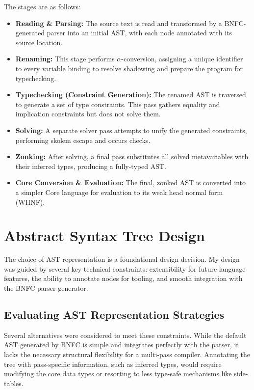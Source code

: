 The stages are as follows:
\begin{itemize}
    \item \textbf{Reading \& Parsing:} The source text is read and transformed by a BNFC-generated parser \cite{bnfc-site-2025} into an initial AST, with each node annotated with its source location.
    \item \textbf{Renaming:} This stage performs $\alpha$-conversion, assigning a unique identifier to every variable binding to resolve shadowing and prepare the program for typechecking.
    \item \textbf{Typechecking (Constraint Generation):} The renamed AST is traversed to generate a set of type constraints. This pass gathers equality and implication constraints but does not solve them.
    \item \textbf{Solving:} A separate solver pass attempts to unify the generated constraints, performing skolem escape and occurs checks.
    \item \textbf{Zonking:} After solving, a final pass substitutes all solved metavariables with their inferred types, producing a fully-typed AST.
    \item \textbf{Core Conversion \& Evaluation:} The final, zonked AST is converted into a simpler Core language for evaluation to its weak head normal form (WHNF).
\end{itemize}

\section{Abstract Syntax Tree Design}
\label{sec:Design:AST}

The choice of AST representation is a foundational design decision. My design was guided by several key technical constraints: extensibility for future language features, the ability to annotate nodes for tooling, and smooth integration with the BNFC parser generator.

\subsection{Evaluating AST Representation Strategies}
Several alternatives were considered to meet these constraints. While the default AST generated by BNFC is simple and integrates perfectly with the parser, it lacks the necessary structural flexibility for a multi-pass compiler. Annotating the tree with pass-specific information, such as inferred types, would require modifying the core data types or resorting to less type-safe mechanisms like side-tables.

